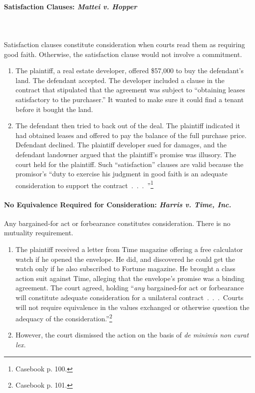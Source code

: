 \paragraph{Satisfaction Clauses: \emph{Mattei v. Hopper}}
~\\\\
Satisfaction clauses constitute consideration when courts read them as 
requiring good faith. Otherwise, the satisfaction clause would not involve a 
commitment.

\begin{enumerate}
    \item The plaintiff, a real estate developer, offered \$57,000 to buy the 
    defendant's land. The defendant accepted. The developer included a clause 
    in the contract that stipulated that the agreement was subject to 
    ``obtaining leases satisfactory to the purchaser.'' It wanted to make sure 
    it could find a tenant before it bought the land.
    \item The defendant then tried to back out of the deal. The plaintiff 
    indicated it had obtained leases and offered to pay the balance of the 
    full purchase price. Defendant declined. The plaintiff developer sued for 
    damages, and the defendant landowner argued that the plaintiff's promise 
    was illusory. The court held for the plaintiff. Such ``satisfaction'' 
    clauses are valid because the promisor's ``duty to exercise his judgment 
    in good faith is an adequate consideration to support the 
    contract~.~.~.~''\footnote{Casebook p. 100.}
\end{enumerate}

\paragraph{No Equivalence Required for Consideration: \emph{Harris v. Time, 
Inc.}}

Any bargained-for act or forbearance constitutes consideration. There is no 
mutuality requirement.

\begin{enumerate}
    \item The plaintiff received a letter from Time magazine offering a free 
    calculator watch if he opened the envelope. He did, and discovered he 
    could get the watch only if he also subscribed to Fortune magazine. He 
    brought a class action suit against Time, alleging that the envelope's 
    promise was a binding agreement. The court agreed, holding ``\emph{any} 
    bargained-for act or forbearance will constitute adequate consideration 
    for a unilateral contract~.~.~.~Courts will not require equivalence in the 
    values exchanged or otherwise question the adequacy of the 
    consideration.''\footnote{Casebook p. 101.}
    \item However, the court dismissed the action on the basis of \emph{de 
    minimis non curat lex.}
\end{enumerate}

